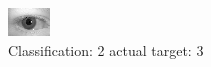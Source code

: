\begin{figure}[h!]
\begin{center}
\includegraphics[width=0.60\columnwidth]{figures/ID652_class_2_target_3.png}
\end{center}
\caption{ Classification: 2 actual target: 3}
\label{fig:ID652_class_2_target_3}
\end{figure}
